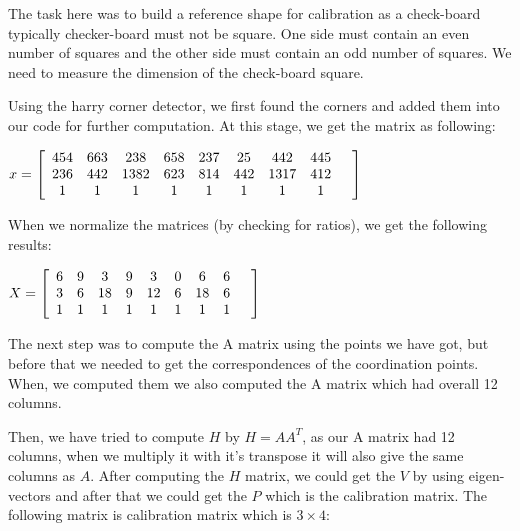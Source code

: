 \documentclass[]{article}
\begin{document}
The task here was to build a reference shape for calibration as a check-board typically checker-board must not be square. One side must contain an even number of squares and the other side must contain an odd number of squares. We need to measure the dimension of the check-board square. 

Using the harry corner detector, we first found the corners and added them into our code for further computation. At this stage, we get the matrix as following: 

\vspace{0.5em}

\centerline {
	$ x =\left[ {\begin{array}{*{20}c}
		454 & 663 & 238 & 658 & 237 & 25 & 442 & 445 \\
		236 & 442 & 1382 & 623 & 814 & 442 & 1317 & 412 \\
		1 & 1 & 1 & 1 & 1 & 1 & 1 & 1 &  
		\end{array} } \right] $
}

\vspace{0.5em}

When we normalize the matrices (by checking for ratios), we get the following results: 

\vspace{0.5em}

\centerline {
	$ X =\left[ {\begin{array}{*{20}c}
		6 & 9 & 3 & 9 & 3 & 0 & 6 & 6 \\
		3 & 6 & 18 & 9 & 12 & 6 & 18 & 6 \\
		1 & 1 & 1 & 1 & 1 & 1 & 1 & 1 &  
		\end{array} } \right] $
}

\vspace{0.5em}

The next step was to compute the A matrix using the points we have got, but before that we needed to get the correspondences of the coordination points. When, we computed them we also computed the A matrix which had overall 12 columns. 

Then, we have tried to compute $H$ by $H=AA^T$, as our A matrix had 12 columns, when we multiply it with it's transpose it will also give the same columns as $A$. After computing the $H$ matrix, we could get the $V$ by using eigen-vectors and after that we could get the $P$ which is the calibration matrix. The following matrix is calibration matrix which is $3 \times 4$:

\vspace{0.5em}
\end{document}
